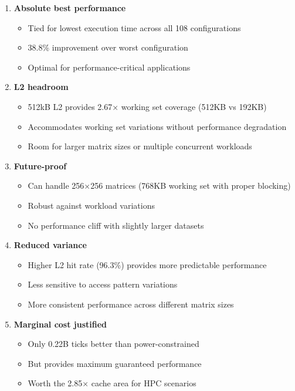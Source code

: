 \documentclass[11pt,a4paper]{article}
\begin{document}
\begin{enumerate}[noitemsep]
    \item \textbf{Absolute best performance}
    \begin{itemize}[noitemsep]
        \item Tied for lowest execution time across all 108 configurations
        \item 38.8\% improvement over worst configuration
        \item Optimal for performance-critical applications
    \end{itemize}

    \item \textbf{L2 headroom}
    \begin{itemize}[noitemsep]
        \item 512kB L2 provides 2.67× working set coverage (512KB vs 192KB)
        \item Accommodates working set variations without performance degradation
        \item Room for larger matrix sizes or multiple concurrent workloads
    \end{itemize}

    \item \textbf{Future-proof}
    \begin{itemize}[noitemsep]
        \item Can handle 256×256 matrices (768KB working set with proper blocking)
        \item Robust against workload variations
        \item No performance cliff with slightly larger datasets
    \end{itemize}

    \item \textbf{Reduced variance}
    \begin{itemize}[noitemsep]
        \item Higher L2 hit rate (96.3\%) provides more predictable performance
        \item Less sensitive to access pattern variations
        \item More consistent performance across different matrix sizes
    \end{itemize}

    \item \textbf{Marginal cost justified}
    \begin{itemize}[noitemsep]
        \item Only 0.22B ticks better than power-constrained
        \item But provides maximum guaranteed performance
        \item Worth the 2.85× cache area for HPC scenarios
    \end{itemize}
\end{enumerate}
\end{document}
